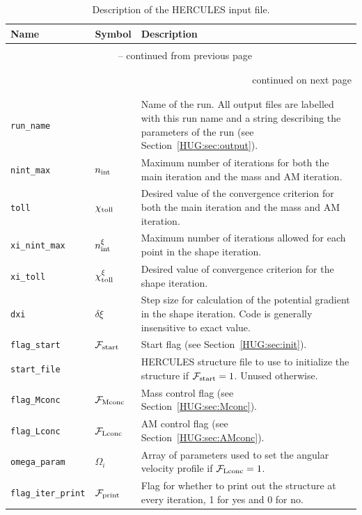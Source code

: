 \documentclass[11pt, oneside]{article}   	%
\begin{document}
\begin{longtable}{l l p{10cm}}
\caption{Description of the HERCULES input file.}
\label{HUG:tab:input} \\

Name & Symbol & Description \\ \hline \hline
\multicolumn{3}{l}{} \\
\endfirsthead

\multicolumn{3}{c}{{\tablename\ \thetable{} -- continued from previous page}} \\
\multicolumn{3}{l}{} \\
\endhead

\multicolumn{3}{l}{} \\
\multicolumn{3}{r}{{continued on next page}} \\
\endfoot

\endlastfoot

\multicolumn{3}{l}{{Run parameters}} \\
\hline \\

\texttt{run\_name} && Name of the run. All output files are labelled with this run name and a string describing the parameters of the run (see Section~\ref{HUG:sec:output}). \\
\texttt{nint\_max} & $n_{\rm int}$ & Maximum number of iterations for both the main iteration and the mass and AM iteration. \\
\texttt{toll} & $\chi_{\rm toll}$ & Desired value of the convergence criterion for both the main iteration and the mass and AM iteration. \\
\texttt{xi\_nint\_max} & $n_{\rm int}^{\xi}$ & Maximum number of iterations allowed for each point in the shape iteration. \\
\texttt{xi\_toll} & $\chi_{\rm toll}^{\xi}$ & Desired value of convergence criterion for the shape iteration.  \\
\texttt{dxi} & $\delta\xi$ & Step size for calculation of the potential gradient in the shape iteration. Code is generally insensitive to exact value. \\
\texttt{flag\_start} & $\mathcal{F}_{\rm start}$ & Start flag (see Section~\ref{HUG:sec:init}). \\
\texttt{start\_file} & & HERCULES structure file to use to initialize the structure if $\mathcal{F}_{\rm start}=1$. Unused otherwise. \\
\texttt{flag\_Mconc} & $\mathcal{F}_{\rm Mconc}$ & Mass control flag (see Section~\ref{HUG:sec:Mconc}). \\
\texttt{flag\_Lconc} & $\mathcal{F}_{\rm Lconc}$ & AM control flag (see Section~\ref{HUG:sec:AMconc}). \\
\texttt{omega\_param} & $\Omega_i$ & Array of parameters used to set the angular velocity profile if $\mathcal{F}_{\rm Lconc}=1$. \\
\texttt{flag\_iter\_print} & $\mathcal{F}_{\rm print}$& Flag for whether to print out the structure at every iteration, 1 for yes and 0 for no.\\


\end{longtable}
\end{document}
